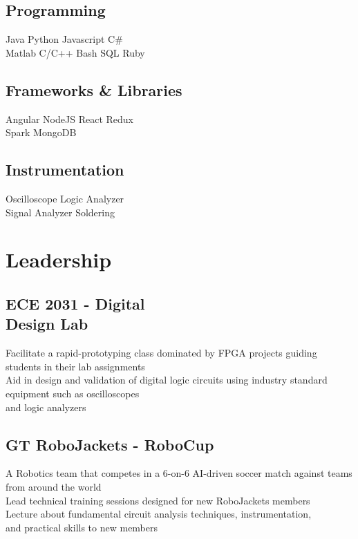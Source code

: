\documentclass[]{deedy-resume-openfont}
\begin{document}
\begin{minipage}[t]{0.32\textwidth}
\subsection{Programming}
Java \textbullet{} Python \textbullet{} Javascript \textbullet{} C\#\\
Matlab \textbullet{} C/C++ \textbullet{}Bash \textbullet{} SQL \textbullet{} Ruby
\sectionsep

\subsection{Frameworks \& Libraries}
Angular \textbullet{} NodeJS \textbullet{} React \textbullet{} Redux \textbullet{} \\
Spark \textbullet{} MongoDB
\sectionsep

\subsection{Instrumentation}
Oscilloscope \textbullet{}  Logic Analyzer \textbullet{} \\  Signal Analyzer \textbullet{} Soldering
\sectionsep

\section{Leadership}
\subsection{ECE 2031 - Digital \\ Design Lab}
\textbullet{} Facilitate a rapid-prototyping class dominated by FPGA projects guiding students in their lab assignments \\
\textbullet{} Aid in design and validation of digital logic circuits using industry standard equipment such as oscilloscopes \\ and logic analyzers
\sectionsep

\subsection{GT RoboJackets - RoboCup}
\textbullet{} A Robotics team that competes in a 6-on-6 AI-driven soccer match against teams from around the world \\
\textbullet{} Lead technical training sessions designed for new RoboJackets members \\
\textbullet{} Lecture about fundamental circuit analysis techniques, instrumentation, \\
and practical skills to new members


\end{minipage}
\end{document}
